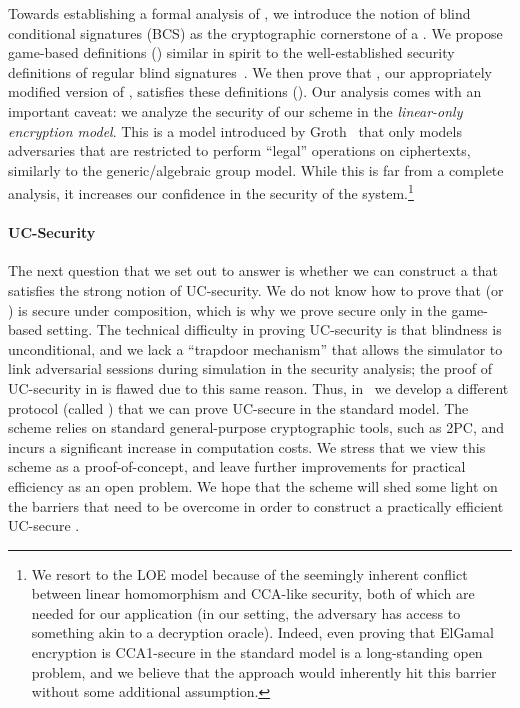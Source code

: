 Towards establishing a formal analysis of \aal, we introduce the notion of blind conditional signatures (BCS) as the cryptographic cornerstone of a \syncpuzzle. We propose game-based definitions () similar in spirit to the well-established security definitions of regular blind signatures~\cite{C:Chaum82,JC:SchUnr17}. We then prove that \aalplus, our appropriately modified version of \aal, satisfies these definitions (). Our analysis comes with an important caveat: we analyze the security of our scheme in the \emph{linear-only encryption model}. This is a model introduced by Groth~\cite{TCC:Groth04} that only models adversaries that are restricted to perform ``legal'' operations on ciphertexts, similarly to the generic/algebraic group model. While this is far from a complete analysis, it increases our confidence in the security of the system.\footnote{We resort to the LOE model because of the seemingly inherent conflict between linear homomorphism and CCA-like security, both of which are needed for our application (in our setting, the adversary has access to something akin to a decryption oracle). Indeed, even proving that ElGamal encryption is CCA1-secure in the standard model is a long-standing open problem, and we believe that the \aal approach would inherently hit this barrier without some additional assumption.}

\paragraph{UC-Security} The next question that we set out to answer is whether we can construct a \syncpuzzle that satisfies the strong notion of UC-security. We do not know how to prove that \aal (or \aalplus) is secure under composition, which is why we prove \aalplus secure only in the game-based setting. The technical difficulty in proving UC-security is that blindness is unconditional, and we lack a ``trapdoor mechanism'' that allows the simulator to link adversarial sessions during simulation in the security analysis; the proof of UC-security in \cite{SP:TaiMorMaf21} is flawed due to this same reason. Thus, in~ we develop a different protocol (called \aaluc) that we can prove UC-secure in the standard model. The scheme relies on standard general-purpose cryptographic tools, such as 2PC, and incurs a significant increase in computation costs. We stress that we view this scheme as a proof-of-concept, and leave further improvements for practical efficiency as an open problem.  We hope that the scheme will shed some light on the barriers that need to be overcome in order to construct a practically efficient UC-secure \syncpuzzle.